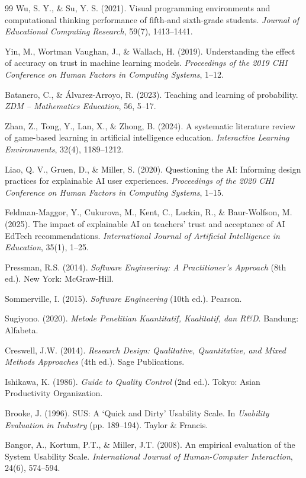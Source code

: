 \documentclass[12pt,a4paper,oneside,openany]{report}
\begin{document}
\begin{thebibliography}{99}
Wu, S. Y., \& Su, Y. S. (2021). Visual programming environments and computational thinking performance of fifth-and sixth-grade students. \textit{Journal of Educational Computing Research}, 59(7), 1413--1441.


Yin, M., Wortman Vaughan, J., \& Wallach, H. (2019). Understanding the effect of accuracy on trust in machine learning models. \textit{Proceedings of the 2019 CHI Conference on Human Factors in Computing Systems}, 1--12.

Batanero, C., \& \'Alvarez-Arroyo, R. (2023). Teaching and learning of probability. \textit{ZDM -- Mathematics Education}, 56, 5--17.

Zhan, Z., Tong, Y., Lan, X., \& Zhong, B. (2024). A systematic literature review of game-based learning in artificial intelligence education. \textit{Interactive Learning Environments}, 32(4), 1189--1212.

Liao, Q. V., Gruen, D., \& Miller, S. (2020). Questioning the AI: Informing design practices for explainable AI user experiences. \textit{Proceedings of the 2020 CHI Conference on Human Factors in Computing Systems}, 1--15.

Feldman-Maggor, Y., Cukurova, M., Kent, C., Luckin, R., \& Baur-Wolfson, M. (2025). The impact of explainable AI on teachers' trust and acceptance of AI EdTech recommendations. \textit{International Journal of Artificial Intelligence in Education}, 35(1), 1--25.


Pressman, R.S. (2014). \textit{Software Engineering: A Practitioner's Approach} (8th ed.). New York: McGraw-Hill.

Sommerville, I. (2015). \textit{Software Engineering} (10th ed.). Pearson.

Sugiyono. (2020). \textit{Metode Penelitian Kuantitatif, Kualitatif, dan R\&D}. Bandung: Alfabeta.

Creswell, J.W. (2014). \textit{Research Design: Qualitative, Quantitative, and Mixed Methods Approaches} (4th ed.). Sage Publications.

Ishikawa, K. (1986). \textit{Guide to Quality Control} (2nd ed.). Tokyo: Asian Productivity Organization.

Brooke, J. (1996). SUS: A `Quick and Dirty' Usability Scale. In \textit{Usability Evaluation in Industry} (pp. 189--194). Taylor \& Francis.

Bangor, A., Kortum, P.T., \& Miller, J.T. (2008). An empirical evaluation of the System Usability Scale. \textit{International Journal of Human-Computer Interaction}, 24(6), 574--594.

\end{thebibliography}
\end{document}
